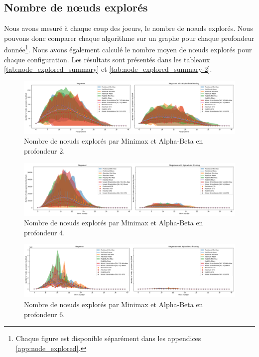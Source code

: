 \subsection*{Nombre de nœuds explorés}
\label{subsec:node_explored}
Nous avons mesuré à chaque coup des joeurs, le nombre de nœuds explorés. Nous pouvons donc comparer chaque algorithme sur un graphe pour chaque profondeur donnée\footnote{Chaque figure est disponible séparément dans les appendices \ref{app:node_explored}.}. Nous avons également calculé le nombre moyen de nœuds explorés pour chaque configuration. Les résultats sont présentés dans les tableaux \ref{tab:node_explored_summary} et \ref{tab:node_explored_summary-2}.

\begin{figure}[H]
    \centering
    \includegraphics[width=\textwidth]{ressources/Number of nodes generated by Black_depth_2_combined.png}
    \caption{Nombre de nœuds explorés par Minimax et Alpha-Beta en profondeur 2.}
    \label{fig:complexity_node_explored-2}
\end{figure}

\begin{figure}[H]
    \centering
    \includegraphics[width=\textwidth]{ressources/Number of nodes generated by Black_depth_4_combined.png}
    \caption{Nombre de nœuds explorés par Minimax et Alpha-Beta en profondeur 4.}
    \label{fig:complexity_node_explored-4}
\end{figure}

\begin{figure}[H]
    \centering
    \includegraphics[width=\textwidth]{ressources/Number of nodes generated by Black_depth_6_combined.png}
    \caption{Nombre de nœuds explorés par Minimax et Alpha-Beta en profondeur 6.}
    \label{fig:complexity_node_explored-6}
\end{figure}

